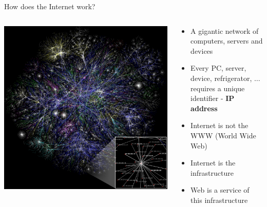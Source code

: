 \documentclass[aspectratio=169,10pt]{beamer}
\begin{document}
  
  \begin{frame}[fragile]{How does the Internet work?}
    \begin{columns}
      \begin{column}{0.5\textwidth}
        \begin{center}
          \href{https://commons.wikimedia.org/wiki/File:Internet_map_1024.jpg}{\includegraphics[height=0.75\textheight]{img/internet.jpg}}
        \end{center}
        \hbox{}
      \end{column}
      \begin{column}{0.5\textwidth}
        \begin{itemize}
          \item A gigantic network of computers, servers and devices
          \item Every PC, server, device, refrigerator, $\ldots$ requires a unique identifier - \textbf{IP address}
          \item Internet is not the WWW (World Wide Web)
          \item Internet is the infrastructure
          \item Web is a service of this infrastructure
        \end{itemize}
      \end{column}
    \end{columns}
  \end{frame}
  
\end{document}
